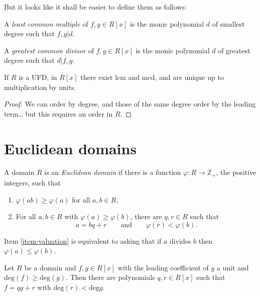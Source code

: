 But it looks like it shall be easier to
define them
as follows:

\begin{definition}
\label{definition-lcm-and-gdc-polynomial}
A {\it least common multiple} of $f,g \in
R[x]$ is the monic polynomial $d$ of
smallest degree such that $f,g|d$.

A {\it greatest common divisor} of $f,g\in
R[x]$ is the monic polynomial $d$ of
greatest degree such that $d|f,g$.
\end{definition}

\begin{lemma}
\label{lemma-existence-of-lcm-and-gcd}
If $R$ is a UFD, in $R[x]$ there exist lcm
and mcd, and are unique up to
multiplication by units.
\end{lemma}

\begin{proof}
We can order by degree, and those of the same
degree order by the leading
term… but this requires an order in $R$.
\end{proof}

\section{Euclidean domains}
\label{section-euclidean-domains}

\begin{definition}
\label{definition-euclidean-domain}
A domain $R$ is an {\it Euclidean domain} if
there
is a function  $\varphi:R\to \mathbb{Z}_+$,
the positive integers,
such that
\begin{enumerate}
\item $\varphi(ab)\geq \varphi(a)$ for all
$a,b \in R$,
\label{item-valuation}
\item For all $a,b \in R$ with $\varphi(a)
\geq \varphi(b)$,
there are $q,r \in R$ such that
$$
a=bq+r\qquad \text{and}
\qquad\varphi(r)<\varphi(b).
$$
\end{enumerate}
\end{definition}

\begin{remark}
\label{remark-equivalence-for-valuation}
Item \ref{item-valuation} is equivalent to
asking that if $a$ divides $b$ then
$\varphi(a) \leq \varphi (b)$.
\end{remark}

\begin{theorem}
\label{theorem-eucli-algor-polyn-rings}
Let $R$ be a domain and $f,g \in R[x]$
with the leading coefficient of $g$ a unit
and $\text{deg}(f)\geq \text{deg}(g)$. Then
there are polynomials $q,r \in R[x]$ such
that
$f=qg+r$ with $\text{deg}(r)<\text{deg}g$.
\end{theorem}

